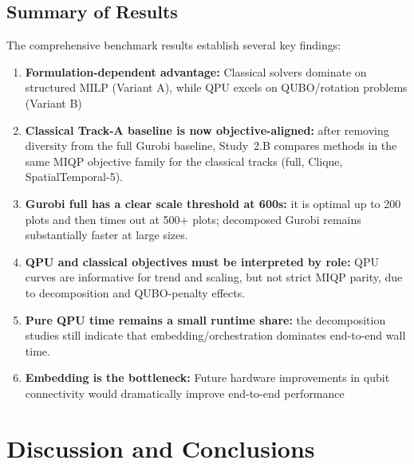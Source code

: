\documentclass{oqireport}
\begin{document}
\subsection{Summary of Results}

The comprehensive benchmark results establish several key findings:

\begin{enumerate}
    \item \textbf{Formulation-dependent advantage:} Classical solvers dominate on structured MILP (Variant A), while QPU excels on QUBO/rotation problems (Variant B)

    \item \textbf{Classical Track-A baseline is now objective-aligned:} after removing diversity from the full Gurobi baseline, Study~2.B compares methods in the same MIQP objective family for the classical tracks (full, Clique, SpatialTemporal-5).

    \item \textbf{Gurobi full has a clear scale threshold at 600s:} it is optimal up to 200 plots and then times out at 500+ plots; decomposed Gurobi remains substantially faster at large sizes.

    \item \textbf{QPU and classical objectives must be interpreted by role:} QPU curves are informative for trend and scaling, but not strict MIQP parity, due to decomposition and QUBO-penalty effects.

    \item \textbf{Pure QPU time remains a small runtime share:} the decomposition studies still indicate that embedding/orchestration dominates end-to-end wall time.

    \item \textbf{Embedding is the bottleneck:} Future hardware improvements in qubit connectivity would dramatically improve end-to-end performance
\end{enumerate}


\newpage
\section{Discussion and Conclusions}
\label{sec:discussion}
\end{document}
